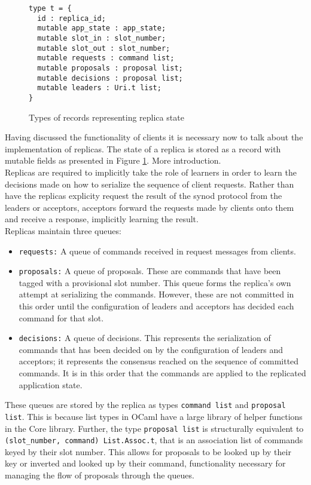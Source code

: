 \begin{figure}
\begin{lstlisting}
type t = {
  id : replica_id;
  mutable app_state : app_state;
  mutable slot_in : slot_number;
  mutable slot_out : slot_number;
  mutable requests : command list;
  mutable proposals : proposal list;
  mutable decisions : proposal list;
  mutable leaders : Uri.t list;
}
\end{lstlisting}
\centering
\caption{Types of records representing replica state}
\label{fig:replica-types}
\end{figure}

Having discussed the functionality of clients it is necessary now to talk about the implementation of replicas. The state of a replica is stored as a record with mutable fields as presented in Figure \ref{fig:replica-types}. More introduction. \\

Replicas are required to implicitly take the role of learners in order to learn the decisions made on how to serialize the sequence of client requests. Rather than have the replicas explicity request the result of the synod protocol from the leaders or acceptors, acceptors forward the requests made by clients onto them and receive a response, implicitly learning the result. \\

Replicas maintain three queues: 
\begin{itemize}
  \item \texttt{requests:} A queue of commands received in request messages from clients.
  \item \texttt{proposals:} A queue of proposals. These are commands that have been tagged with a provisional slot number. This queue forms the replica's own attempt at serializing the commands. However, these are not committed in this order until the configuration of leaders and acceptors has decided each command for that slot.
  \item \texttt{decisions:} A queue of decisions. This represents the serialization of commands that has been decided on by the configuration of leaders and acceptors; it represents the consensus reached on the sequence of committed commands. It is in this order that the commands are applied to the replicated application state.
\end{itemize}

These queues are stored by the replica as types \texttt{command list} and \texttt{proposal list}. This is because list types in OCaml have a large library of helper functions in the Core library. Further, the type \texttt{proposal list} is structurally equivalent to \texttt{(slot\_number, command) List.Assoc.t}, that is an association list of commands keyed by their slot number. This allows for proposals to be looked up by their key or inverted and looked up by their command, functionality necessary for managing the flow of proposals through the queues. \\

